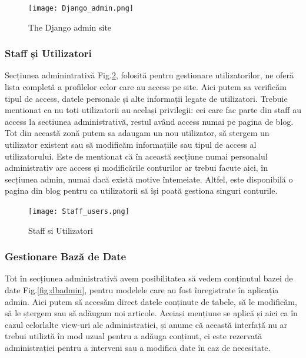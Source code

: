 \documentclass[11pt]{scrartcl} %
\begin{document}
\begin{figure}[h] %
	\centering
	\texttt{[image: Django\_admin.png]} %
	\caption{The Django admin site}
	\label{fig:djadmin}
\end{figure}


\subsubsection{Staff și Utilizatori}



Secțiunea adminintrativă Fig.\ref{fig:staff&users}, folosită pentru gestionare utilizatorilor, ne oferă lista completă a profilelor celor care au access pe site. Aici putem sa verificăm tipul de access, datele personale și alte informații legate de utilizatori. Trebuie mentionat ca nu toți utilizatorii au același privilegii: cei care fac parte din staff au access la sectiunea administrativă, restul având access numai pe pagina de blog. \\
Tot din această zonă putem sa adaugam un nou utilizator, să stergem un utilizator existent sau să modificăm informațiile sau tipul de access al utilizatorului. Este de mentionat că în această secțiune numai personalul administrativ are access și modificările conturilor ar trebui facute aici, în secțiunea admin, numai dacă există motive întemeiate. Altfel, este disponibilă o pagina din blog pentru ca utilizatorii să își poată gestiona singuri conturile.

\begin{figure}[h] %
	\centering
	\texttt{[image: Staff\_users.png]} %
	\caption{Staff si Utilizatori}
	\label{fig:staff&users}
\end{figure}


\subsubsection{Gestionare Bază de Date}

Tot în secțiunea administrativă avem posibilitatea să vedem conținutul bazei de date Fig.\ref{fig:dbadmin}, pentru modelele care au fost înregistrate în aplicația admin. Aici putem să accesăm direct datele conținute de  tabele, să le modificăm, să le ștergem sau să adăugam noi articole. Aceiași mențiune se aplică și aici ca în cazul celorlalte view-uri ale administratiei, și anume că această interfață nu ar trebui utiliztă în mod uzual pentru a adăuga conținut, ci este rezervată administrației pentru a interveni sau a modifica date în caz de necesitate.
\end{document}
